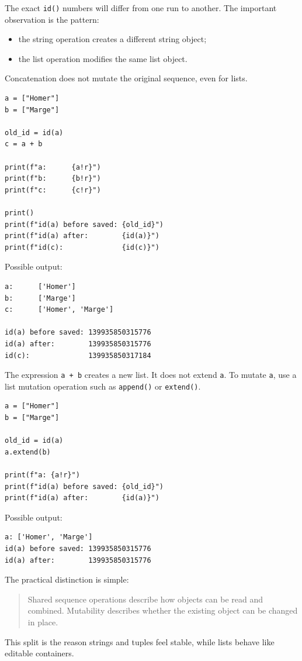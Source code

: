 The exact \texttt{id()} numbers will differ from one run to another. The important observation is the pattern:

\begin{itemize}
    \item the string operation creates a different string object;
    \item the list operation modifies the same list object.
\end{itemize}

Concatenation does not mutate the original sequence, even for lists.

\begin{verbatim}
a = ["Homer"]
b = ["Marge"]

old_id = id(a)
c = a + b

print(f"a:      {a!r}")
print(f"b:      {b!r}")
print(f"c:      {c!r}")

print()
print(f"id(a) before saved: {old_id}")
print(f"id(a) after:        {id(a)}")
print(f"id(c):              {id(c)}")
\end{verbatim}

Possible output:

\begin{verbatim}
a:      ['Homer']
b:      ['Marge']
c:      ['Homer', 'Marge']

id(a) before saved: 139935850315776
id(a) after:        139935850315776
id(c):              139935850317184
\end{verbatim}

The expression \texttt{a + b} creates a new list. It does not extend \texttt{a}. To mutate \texttt{a}, use a list mutation operation such as \texttt{append()} or \texttt{extend()}.

\begin{verbatim}
a = ["Homer"]
b = ["Marge"]

old_id = id(a)
a.extend(b)

print(f"a: {a!r}")
print(f"id(a) before saved: {old_id}")
print(f"id(a) after:        {id(a)}")
\end{verbatim}

Possible output:

\begin{verbatim}
a: ['Homer', 'Marge']
id(a) before saved: 139935850315776
id(a) after:        139935850315776
\end{verbatim}

The practical distinction is simple:

\begin{quote}
Shared sequence operations describe how objects can be read and combined. Mutability describes whether the existing object can be changed in place.
\end{quote}

This split is the reason strings and tuples feel stable, while lists behave like editable containers.
